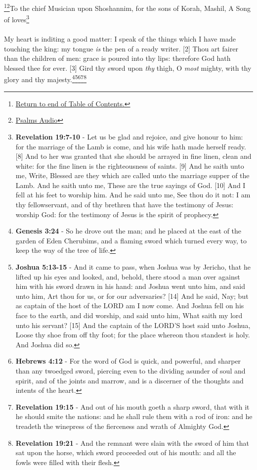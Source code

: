 \footnote{\textcolor[cmyk]{0.99998,1,0,0}{\hyperlink{TOC}{Return to end of Table of Contents.}}}\footnote{\href{https://www.audioverse.org/english/audiobibles/books/ENGKJV/O/Ps/1}{\textcolor[cmyk]{0.99998,1,0,0}{Psalms Audio}}}\textcolor[cmyk]{0.99998,1,0,0}{To the chief Musician upon Shoshannim, for the sons of Korah, Mashil, A Song of loves}\footnote{\textbf{Revelation 19:7-10} - Let us be glad and rejoice, and give honour to him: for the marriage of the Lamb is come, and his wife hath made herself ready. [8] And to her was granted that she should be arrayed in fine linen, clean and white: for the fine linen is the righteousness of saints. [9] And he saith unto me, Write, Blessed are they which are called unto the marriage supper of the Lamb. And he saith unto me, These are the true sayings of God. [10] And I fell at his feet to worship him. And he said unto me, See thou do it not: I am thy fellowservant, and of thy brethren that have the testimony of Jesus: worship God: for the testimony of Jesus is the spirit of prophecy.}\\
\\
\textcolor[cmyk]{0.99998,1,0,0}{My heart is inditing a good matter: I speak of the things which I have made touching the king: my tongue \emph{is} the pen of a ready writer.}
[2] \textcolor[cmyk]{0.99998,1,0,0}{Thou art fairer than the children of men: grace is poured into thy lips: therefore God hath blessed thee for ever.}
[3] \textcolor[cmyk]{0.99998,1,0,0}{Gird thy sword upon \emph{thy} thigh, O \emph{most} mighty, with thy glory and thy majesty.}\footnote{\textbf{Genesis 3:24} - So he drove out the man; and he placed at the east of the garden of Eden Cherubims, and a flaming sword which turned every way, to keep the way of the tree of life.}\footnote{\textbf{Joshua 5:13-15} - And it came to pass, when Joshua was by Jericho, that he lifted up his eyes and looked, and, behold, there stood a man over against him with his sword drawn in his hand: and Joshua went unto him, and said unto him, Art thou for us, or for our adversaries? [14] And he said, Nay; but as captain of the host of the LORD am I now come. And Joshua fell on his face to the earth, and did worship, and said unto him, What saith my lord unto his servant? [15] And the captain of the LORD’S host said unto Joshua, Loose thy shoe from off thy foot; for the place whereon thou standest is holy. And Joshua did so.}\footnote{\textbf{Hebrews 4:12} - For the word of God is quick, and powerful, and sharper than any twoedged sword, piercing even to the dividing asunder of soul and spirit, and of the joints and marrow, and is a discerner of the thoughts and intents of the heart.}\footnote{\textbf{Revelation 19:15} - And out of his mouth goeth a sharp sword, that with it he should smite the nations: and he shall rule them with a rod of iron: and he treadeth the winepress of the fierceness and wrath of Almighty God.}\footnote{\textbf{Revelation 19:21} - And the remnant were slain with the sword of him that sat upon the horse, which sword proceeded out of his mouth: and all the fowls were filled with their flesh.} 
